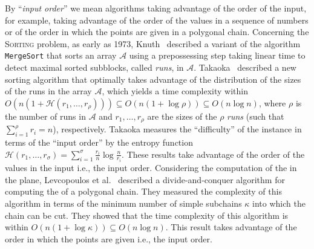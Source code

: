 By ``\emph{input order}'' we mean algorithms taking advantage of the order
of the input, for example, taking advantage of the order of the values
in a sequence of numbers or of the order in which the points are given
in a polygonal chain.
Concerning the \textsc{Sorting} problem, as early as 1973,
Knuth~\cite{1973-BOOK-TheArtOfComputerProgrammingVol3-Knuth} described
a variant of the algorithm {\tt{MergeSort}} that sorts an array
$\mathcal{A}$ using a prepossessing step taking linear time to detect
maximal sorted subblocks, called \emph{runs}, in $\mathcal{A}$.
Takaoka~\cite{2009-Chapter-PartialSolutionAndEntropy-Takaoka}
described a new sorting algorithm that optimally takes advantage of
the distribution of the sizes of the runs in the array $\mathcal{A}$,
which yields a time complexity within
$O(n(1+\mathcal{H}(r_1, \dots, r_{\rho}))) \subseteq
O(n(1{+}\log{\rho})) \subseteq O(n\log{n})$, where $\rho$ is the
number of runs in $\mathcal{A}$ and $r_1, \dots, r_{\rho}$ are the
sizes of the $\rho$ \emph{runs} (such that $\sum_{i=1}^\rho {r_i}=n$),
respectively. Takaoka measures the ``difficulty'' of the instance in
terms of the ``input order'' by the entropy function
$\mathcal{H}(r_1, \dots, r_\sigma) =
\sum_{i=1}^\sigma{\frac{r_i}{n}}\log{\frac{n}{r_i}}$. These results
take advantage of the order of the values in the input i.e., the input
order.
Considering the computation of the {} in the plane,
Levcopoulos et
al.~\cite{2002-SWAT-AdaptiveAlgorithmsForConstructingConvexHullsAndTriangulationsOfPolygonalChains-LevcopoulosLingasMitchell}
described a divide-and-conquer algorithm for computing the {} of a polygonal chain. They measured the complexity of this
algorithm in terms of the minimum number of simple subchains $\kappa$
into which the chain can be cut.  They showed that the time complexity
of this algorithm is within
$O(n(1{+}\log{\kappa})) \subseteq O(n\log{n})$. This result takes
advantage of the order in which the points are given i.e., the input
order.

